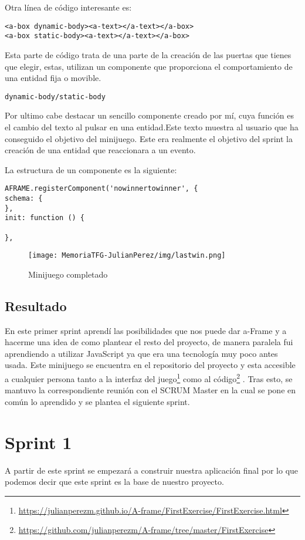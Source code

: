 \documentclass[a4paper, 12pt]{book}
\begin{document}
Otra línea de código interesante es:
\begin{verbatim}
<a-box dynamic-body><a-text></a-text></a-box>
<a-box static-body><a-text></a-text></a-box>
\end{verbatim} 

Esta parte de código  trata de una parte de la creación de las puertas que tienes que elegir, estas, utilizan un componente que proporciona el comportamiento de una entidad fija o movible.\begin{verbatim}dynamic-body/static-body \end{verbatim}

Por ultimo cabe destacar un sencillo componente creado por mí, cuya función es el cambio del texto al pulsar en una entidad.Este texto muestra al usuario que ha conseguido el objetivo del minijuego.  Este era realmente el objetivo del sprint la creación de una entidad que reaccionara a un evento.

La estructura de un componente es la siguiente:
\begin{verbatim}
AFRAME.registerComponent('nowinnertowinner', {
schema: {
},
init: function () {

},
\end{verbatim} 

\begin{figure}[H]
  \centering
  \texttt{[image: MemoriaTFG-JulianPerez/img/lastwin.png]}
  \caption{Minijuego completado}\label{scrum}
\end{figure}

\subsection{Resultado}
En este primer sprint aprendí las posibilidades que nos puede dar a-Frame y a hacerme una idea de como plantear el resto del proyecto, de manera paralela fui aprendiendo a utilizar JavaScript ya que era una tecnología muy poco antes usada. Este minijuego se encuentra en el repositorio del proyecto y esta accesible a cualquier persona tanto a la interfaz del juego\footnote{\url{https://julianperezm.github.io/A-frame/FirstExercise/FirstExercise.html}}  como al código\footnote{\url{https://github.com/julianperezm/A-frame/tree/master/FirstExercise}} . Tras esto, se mantuvo la correspondiente reunión con el SCRUM Master en la cual se pone en común lo aprendido y se plantea el siguiente sprint.

\section{Sprint 1}
A partir de este sprint se empezará a construir nuestra aplicación final por lo que podemos decir que este sprint es la base de nuestro proyecto. 
\end{document}
